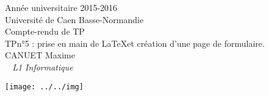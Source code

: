 \documentclass[a4paper]{article}
\begin{document}

\begin{titlepage}
	\begin{center}
		\Large{Année universitaire 2015-2016}\\
		\Large{Université de Caen Basse-Normandie}\\[1cm]
		
		\huge Compte-rendu de TP\\[0.5cm]
		TPn°5 : prise en main de \LaTeX et création d'une page de formulaire.\\
		\vspace{1cm}
		CANUET Maxime\\
	\normalsize{\textit{ ~ L1 Informatique}}
		\vspace{2cm}
		
		\texttt{[image: ../../img]}
	\end{center}
\end{titlepage}

\newpage

	\tableofcontents
\newpage

\end{document}

